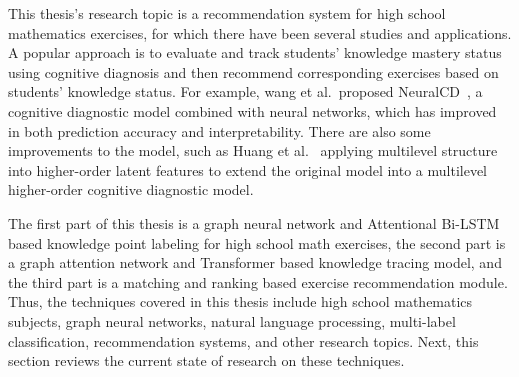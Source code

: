 This thesis's research topic is a recommendation system for high school mathematics exercises, for which there have been several studies and applications. A popular approach is to evaluate and track students' knowledge mastery status using cognitive diagnosis and then recommend corresponding exercises based on students' knowledge status. For example, wang et al.\ proposed NeuralCD~\cite{wang2020neural}, a cognitive diagnostic model combined with neural networks, which has improved in both prediction accuracy and interpretability. There are also some improvements to the model, such as Huang et al.~\cite{huang2017hcdm} applying multilevel structure into higher-order latent features to extend the original model into a multilevel higher-order cognitive diagnostic model.


The first part of this thesis is a graph neural network and Attentional Bi-LSTM based knowledge point labeling for high school math exercises, the second part is a graph attention network and Transformer based knowledge tracing model, and the third part is a matching and ranking based exercise recommendation module. Thus, the techniques covered in this thesis include high school mathematics subjects, graph neural networks, natural language processing, multi-label classification, recommendation systems, and other research topics. Next, this section reviews the current state of research on these techniques.

